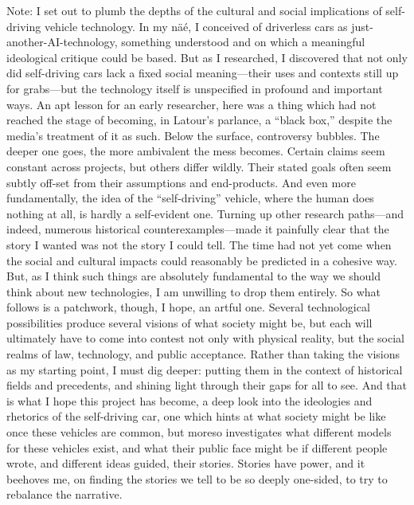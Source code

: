 Note: I set out to plumb the depths of the cultural and social
implications of self-driving vehicle technology. In my na\"\ivet\'{e}, I
conceived of driverless cars as just-another-AI-technology, something
understood and on which a meaningful ideological critique could be
based. But as I researched, I discovered that not only did
self-driving cars lack a fixed social meaning---their uses and
contexts still up for grabs---but the technology itself is unspecified
in profound and important ways. An apt lesson for an early researcher,
here was a thing which had not reached the stage of becoming, in
Latour's parlance, a ``black box,'' despite the media's treatment of
it as such. Below the surface, controversy bubbles. The deeper one
goes, the more ambivalent the mess becomes. Certain claims seem
constant across projects, but others differ wildly. Their stated goals
often seem subtly off-set from their assumptions and end-products. And
even more fundamentally, the idea of the ``self-driving'' vehicle,
where the human does nothing at all, is hardly a self-evident one.
Turning up other research paths---and indeed, numerous historical
counterexamples---made it painfully clear that the story I wanted was
not the story I could tell. The time had not yet come when the social
and cultural impacts could reasonably be predicted in a cohesive way.
But, as I think such things are absolutely fundamental to the way we
should think about new technologies, I am unwilling to drop them
entirely. So what follows is a patchwork, though, I hope, an artful
one. Several technological possibilities produce several visions of
what society might be, but each will ultimately have to come into
contest not only with physical reality, but the social realms of law,
technology, and public acceptance. Rather than taking the visions as
my starting point, I must dig deeper: putting them in the context of
historical fields and precedents, and shining light through their gaps
for all to see. And that is what I hope this project has become, a
deep look into the ideologies and rhetorics of the self-driving car,
one which hints at what society might be like once these
vehicles are common, but moreso investigates what different models for these vehicles
exist, and what their public face might be if different people wrote,
and different ideas guided, their stories. Stories have power, and it
beehoves me, on finding the stories we tell to be so deeply one-sided,
to try to rebalance the narrative.
